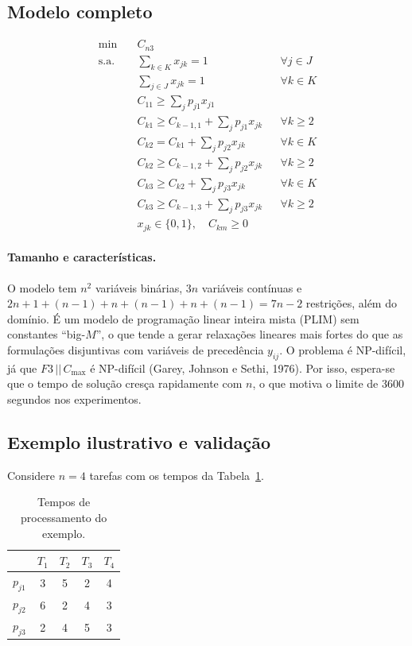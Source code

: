 \documentclass[11pt,a4paper]{article}
\begin{document}
\subsection{Modelo completo}

\begin{align*}
  \min\quad & C_{n3}\\
  \text{s.a.}\quad
  & \textstyle\sum_{k\in K} x_{jk} = 1 && \forall j \in J\\
  & \textstyle\sum_{j\in J} x_{jk} = 1 && \forall k \in K\\
  & C_{11} \ge \textstyle\sum_{j} p_{j1}x_{j1}\\
  & C_{k1} \ge C_{k-1,1} + \textstyle\sum_{j} p_{j1}x_{jk} && \forall k \ge 2\\
  & C_{k2} = C_{k1} + \textstyle\sum_{j} p_{j2}x_{jk} && \forall k \in K\\
  & C_{k2} \ge C_{k-1,2} + \textstyle\sum_{j} p_{j2}x_{jk} && \forall k \ge 2\\
  & C_{k3} \ge C_{k2} + \textstyle\sum_{j} p_{j3}x_{jk} && \forall k \in K\\
  & C_{k3} \ge C_{k-1,3} + \textstyle\sum_{j} p_{j3}x_{jk} && \forall k \ge 2\\
  & x_{jk} \in \{0,1\},\quad C_{km} \ge 0
\end{align*}

\paragraph{Tamanho e características.} O modelo tem $n^2$ variáveis binárias,
$3n$ variáveis contínuas e $2n + 1 + (n-1) + n + (n-1) + n + (n-1) = 7n - 2$
restrições, além do domínio. É um modelo de programação linear inteira mista
(PLIM) sem constantes ``big-$M$'', o que tende a gerar relaxações lineares mais
fortes do que as formulações disjuntivas com variáveis de precedência
$y_{ij}$. O problema é NP-difícil, já que $F3 \,||\, C_{\max}$ é NP-difícil
(Garey, Johnson e Sethi, 1976). Por isso, espera-se que o tempo de solução
cresça rapidamente com $n$, o que motiva o limite de 3600 segundos nos
experimentos.

\subsection{Exemplo ilustrativo e validação}

Considere $n=4$ tarefas com os tempos da Tabela~\ref{tab:ex}.

\begin{table}[h]
\centering
\begin{tabular}{lcccc}
\toprule
 & $T_1$ & $T_2$ & $T_3$ & $T_4$\\
\midrule
$p_{j1}$ & 3 & 5 & 2 & 4\\
$p_{j2}$ & 6 & 2 & 4 & 3\\
$p_{j3}$ & 2 & 4 & 5 & 3\\
\bottomrule
\end{tabular}
\caption{Tempos de processamento do exemplo.}
\label{tab:ex}
\end{table}
\end{document}
